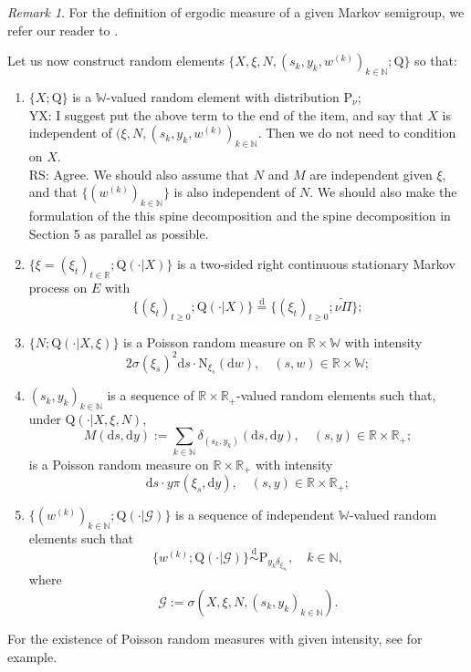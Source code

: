 \documentclass[12pt,a4paper]{amsart}
\numberwithin{equation}{section}
\theoremstyle{plain}
\theoremstyle{definition}
\theoremstyle{remark}
\newtheorem{remark}{Remark}
\begin{document}
\begin{remark}
	For the definition of ergodic measure of a given Markov semigroup, we refer our reader to \cite[Section 3.2]{DaPratoZabczyk1996Ergodicity}.
\end{remark}



	Let us now construct random elements
  	$\big\{X, \xi, N, (s_k, y_k,w^{(k)})_{k\in \mathbb N}; \mathrm Q\big\}$ so that:
\begin{enumerate}[label=(Q\arabic*),ref=Q\arabic*]
\item \label{asp:Q1}
	$\{X;\mathrm Q\}$ is a $\mathbb W$-valued random element with distribution $\mathrm P_\nu$;
{\\\color{red} YX: I suggest put the above term to the end of the item, and say that $X$ is independent of $(\xi, N, (s_k, y_k,w^{(k)})_{k\in \mathbb N}$. Then we do not need to condition on $X$.\\
RS: Agree. We should also assume that $N$ and $M$ are independent given $\xi$,
and that $\{(w^{(k)})_{k\in \mathbb N}\}$ is also independent of $N$. We should also make the formulation of the this spine decomposition and the spine decomposition in Section 5 as parallel as possible.}
\item \label{asp:Q2}
		$\{\xi = (\xi_t)_{t\in \mathbb R}; \mathrm Q(\cdot | X)\}$
is a two-sided right continuous stationary Markov process on $E$ with
		 \[\{(\xi_t)_{t \geq 0}; \mathrm Q(\cdot | X)\} \overset{\text{d}} = \{(\xi_t)_{t \geq 0}; \widetilde{\nu\Pi}\};\]
\item \label{asp:Q3}
	$\{N; \mathrm Q(\cdot |X,\xi)\}$ is a Poisson random measure on $\mathbb R\times \mathbb W$ with intensity
\[
	2 \sigma(\xi_s)^2 {\mathrm d}s \cdot \mathrm N_{\xi_s}({\mathrm d}w),
	\quad (s,w)\in \mathbb R\times \mathbb W;
\]
\item \label{asp:Q4}
	$(s_k, y_k)_{k\in \mathbb N}$ is a sequence of $\mathbb R \times \mathbb R_+$-valued random elements
	such that, under $\mathrm Q(\cdot | X, \xi, N)$,
\[
	M(\mathrm ds,\mathrm dy)
	:= \sum_{k\in \mathbb N} \delta_{(s_k, y_k)}(\mathrm ds,\mathrm dy), \quad (s,y)\in \mathbb R \times \mathbb R_+;
\]	
is a Poisson random measure on $\mathbb R \times \mathbb R_+$ with intensity
\[
	\mathrm ds \cdot y \pi(\xi_s, \mathrm dy), \quad (s,y)\in \mathbb R \times \mathbb R_+;
\]
\item \label{asp:Q5}
	$\{(w^{(k)})_{k\in \mathbb N}; \mathrm Q(\cdot|\mathscr G)\}$ is a sequence of independent $\mathbb W$-valued random elements such that
\[
	\{w^{(k)}; \mathrm Q(\cdot| \mathscr G)\}
	\overset{\text{d}}\sim \mathrm P_{y_k\delta_{\xi_{s_k}}},
	\quad k\in \mathbb N,
\]
	where
\[
	\mathscr G
	:= \sigma(X, \xi, N, (s_k, y_k)_{k\in \mathbb N}).
\]
\end{enumerate}
	For the existence of Poisson random measures with given intensity, see \cite[Theorem 2.4]{Kyprianou2014Fluctuations} for example.
	
\end{document}
